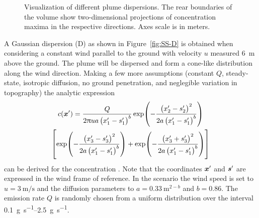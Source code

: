 \begin{figure}
    \centering
    \caption[Visualizations of plume dispersions.]{Visualization of different 
        plume dispersions. The rear boundaries of the volume show 
        two-dimensional projections of concentration maxima in the respective 
        directions. Axes scale is in meters.}
\end{figure}

A Gaussian dispersion (D) as shown in Figure~\ref{fig:SS-D} is obtained when 
considering a constant wind parallel to the ground with velocity $u$ measured 
\SI{6}{\meter} above the ground. The plume will be dispersed and form 
a cone-like distribution along the wind direction.  Making a few more 
assumptions (constant $Q$, steady-state, isotropic diffusion, no ground 
penetration, and neglegible variation in topography) the analytic expression
\begin{multline}\label{eqn:plumedisp}
    c(\vc x') = \frac{Q}{2\uppi ua\del{x'_1 - s'_1}^b} 
    \exp\!\del{-\frac{\del{x'_2 - s'_2}^2}{2a\del{x'_1 - s'_1}^b}} \\ 
    \sbr{\exp\!\del{-\frac{\del{x'_3 - s'_3}^2}{2a\del{x'_1 - s'_1}^b}} 
        + \exp\!\del{-\frac{\del{x'_3 + s'_3}^2}{2a\del{x'_1 - s'_1}^b}}}
\end{multline}
can be derived for the concentration \parencite{Stockie:2011fd}. Note that the 
coordinates $\bm{x}'$ and $\bm{s}'$ are expressed in the wind frame of reference.  
In the scenario the wind speed is set to $u = \SI{3}{\meter\per\second}$ and the 
diffusion parameters to $a = \SI{0.33}{\meter\tothe{2 - \mathit{b}}}$ and $b 
= 0.86$.  The emission rate $Q$ is randomly chosen from a uniform distribution 
over the interval \SIrange{0.1}{2.5}{\gram\per\second}.

